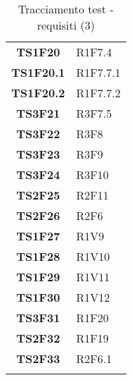 {\begin{minipage}[b]{.3\linewidth}
\begin{longtable}{c | L{2cm}}
		\textbf{TS1F20} & R1F7.4\\
		\textbf{TS1F20.1} & R1F7.7.1\\		
		\textbf{TS1F20.2} & R1F7.7.2\\			
		\textbf{TS3F21} & R3F7.5\\
		\textbf{TS3F22} & R3F8\\
		\textbf{TS3F23} & R3F9\\
		\textbf{TS3F24} & R3F10\\
		\textbf{TS2F25} & R2F11\\
		\textbf{TS2F26} & R2F6\\
		\textbf{TS1F27} & R1V9\\
		\textbf{TS1F28} & R1V10\\
		\textbf{TS1F29} & R1V11\\
		\textbf{TS1F30} & R1V12\\
		\textbf{TS3F31} & R1F20\\
		
		\textbf{TS2F32} & R1F19\\
		\textbf{TS2F33} & R2F6.1\\
		
		
		
		
		
		\captionsetup{width=.9\textwidth}		
		\caption{Tracciamento test - requisiti (3)}
	\end{longtable}
\end{minipage}
}
\newpage